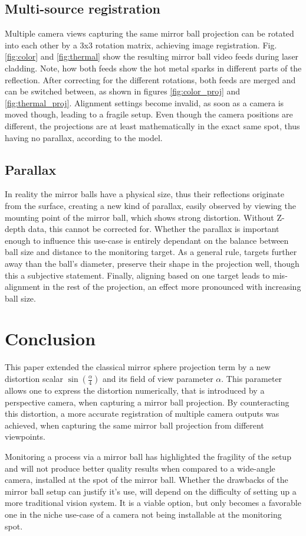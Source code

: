 \documentclass[10pt]{article}
\begin{document}
\begin{multicols}{2}
	\subsection{Multi-source registration}
	Multiple camera views capturing the same mirror ball projection can be rotated into each other by a 3x3 rotation matrix, achieving image registration. Fig. \ref{fig:color} and \ref{fig:thermal} show the resulting mirror ball video feeds during laser cladding. Note, how both feeds show the hot metal sparks in different parts of the reflection. After correcting for the different rotations, both feeds are merged and can be switched between, as shown in figures \ref{fig:color_proj} and \ref{fig:thermal_proj}. Alignment settings become invalid, as soon as a camera is moved though, leading to a fragile setup. Even though the camera positions are different, the projections are at least mathematically in the exact same spot, thus having no parallax, according to the model.
	
	\subsection{Parallax}\label{parallax}
	In reality the mirror balls have a physical size, thus their reflections originate from the surface, creating a new kind of parallax, easily observed by viewing the mounting point of the mirror ball, which shows strong distortion. Without Z-depth data, this cannot be corrected for. Whether the parallax is important enough to influence this use-case is entirely dependant on the balance between ball size and distance to the monitoring target. As a general rule, targets further away than the ball's diameter, preserve their shape in the projection well, though this a subjective statement. Finally, aligning based on one target leads to mis-alignment in the rest of the projection, an effect more pronounced with increasing ball size.

	\section{Conclusion}
	This paper extended the classical mirror sphere projection term by a new distortion scalar $\sin{\left(\frac{\alpha}{4}\right)}$ and its field of view parameter $\alpha$. This parameter allows one to express the distortion numerically, that is introduced by a perspective camera, when capturing a mirror ball projection. By counteracting this distortion, a more accurate registration of multiple camera outputs was achieved, when capturing the same mirror ball projection from different viewpoints.

	Monitoring a process via a mirror ball has highlighted the fragility of the setup and will not produce better quality results when compared to a wide-angle camera, installed at the spot of the mirror ball. Whether the drawbacks of the mirror ball setup can justify it's use, will depend on the difficulty of setting up a more traditional vision system. It is a viable option, but only becomes a favorable one in the niche use-case of a camera not being installable at the monitoring spot.

	\pagebreak
	
\end{multicols}
\end{document}
